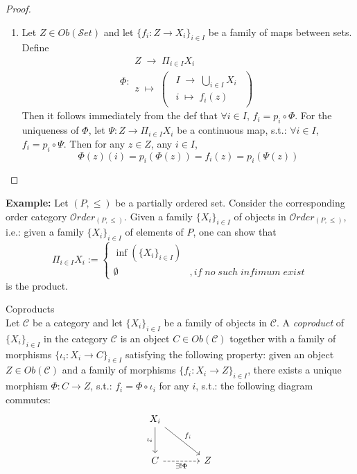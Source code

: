 \begin{proof}
    \begin{enumerate}
        \item Let $Z \in Ob(\mathcal{S}et)$ and let $\{f_i: Z \to X_i\}_{i \in I}$ be a family of maps between sets. Define 
        $$\Phi: \substack{Z \;\to\; \Pi_{i \in I} X_i\\
        z \;\mapsto\; \begin{pmatrix}
            \substack{I \;\to\; \bigcup_{i \in I}X_i\\
            i\;\mapsto\; f_i(z)}
        \end{pmatrix} }$$
        Then it follows immediately from the def that $\forall i \in I$, $f_i = p_i \circ\Phi$. For the uniqueness of $\Phi$, let $\Psi: Z \to \Pi_{i \in I}X_i$ be a continuous map, s.t.: $\forall i \in I$, $f_i = p_i \circ \Psi$. Then for any $z \in Z$, any $i \in I$,
        $$\Phi(z) (i) = p_i (\Phi(z)) = f_i(z) =  p_i (\Psi(z))$$
    \end{enumerate}
\end{proof}

\noindent\textbf{Example:} Let $(P,\leq)$ be a partially ordered set. Consider the corresponding order category $\mathcal{O}rder_{(P,\leq)}$. Given a family $\{X_i\}_{i \in I}$ of objects in $\mathcal{O}rder_{(P,\leq)}$, i.e.: given a family $\{X_i\}_{i \in I}$ of elements of $P$, one can show that 
$$\Pi_{i \in I} X_i := \begin{cases}
    \inf (\{X_i\}_{i \in I}) \\
    \emptyset &,if \;no\; such\; infimum\; exist
\end{cases}$$
is the product.

\begin{definition}{Coproducts}\\
Let $\mathcal{C}$ be a category and let $\{ X_i\}_{i \in I}$ be a family of objects in $\mathcal{C}$. A \textit{coproduct} of $\{ X_i \}_{i \in I}$ in the category $\mathcal{C}$ is an object  $C \in Ob(\mathcal{C})$ together with a family of morphisms $\{ \iota_i: X_i \to C\} _{i \in I}$ satisfying the following property:
\noindent given an object $Z \in Ob(\mathcal{C})$ and a family of morphisms $\{ f_i : X_i \to Z\}_{i \in I}$, there exists a unique morphism $\Phi: C \to Z$, s.t.: $f_i= \Phi \circ \iota_i$ for any $i$, s.t.: the following diagram commutes:
$$
\begin{tikzcd}[row sep=large, column sep=large]
    X_i \arrow[d, "\iota_i"'] \arrow[dr, "f_i"]\\
    C \arrow[r, dashed, "\exists ! \Phi"'] &Z
\end{tikzcd}
$$
\end{definition}


